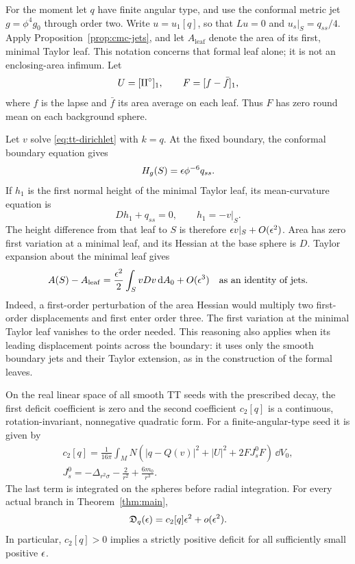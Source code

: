 For the moment let $q$ have finite angular type, and use the conformal
metric jet $g=\phi^4g_0$ through order two.  Write $u=u_1[q]$, so that
$Lu=0$ and $u_s|_S=q_{ss}/4$.  Apply
Proposition~\ref{prop:cmc-jets}, and let $A_{\mathrm{leaf}}$ denote the
area of its first, minimal Taylor leaf.  This notation concerns that
formal leaf alone; it is not an enclosing-area infimum.  Let
\[
 U=[\mathrm{II}^{\circ}]_1,
 \qquad F=[f-\bar f]_1,
\]
where $f$ is the lapse and $\bar f$ its area average on each leaf.
Thus $F$ has zero round mean on each background sphere.

Let $v$ solve \eqref{eq:tt-dirichlet} with $k=q$.  At the fixed boundary,
the conformal boundary equation gives
\[
 H_g(S)=\epsilon\phi^{-6}q_{ss}.
\]
If $h_1$ is the first normal height of the minimal Taylor leaf, its
mean-curvature equation is
\[
 Dh_1+q_{ss}=0,
 \qquad h_1=-v|_S.
\]
The height difference from that leaf to $S$ is therefore
$\epsilon v|_S+O(\epsilon^2)$.  Area has zero first variation at a minimal
leaf, and its Hessian at the base sphere is $D$.  Taylor expansion about
the minimal leaf gives
\begin{equation}
 A(S)-A_{\mathrm{leaf}}
 =\frac{\epsilon^2}{2}\int_SvDv\,\mathrm{d} A_0+O(\epsilon^3)
 \quad\text{as an identity of jets}.
 \label{eq:quadratic-area-gap}
\end{equation}
Indeed, a first-order perturbation of the area Hessian would multiply
two first-order displacements and first enter order three.  The first
variation at the minimal Taylor leaf vanishes to the order needed.
This reasoning also applies when its leading displacement points across
the boundary: it uses only the smooth boundary jets and their Taylor
extension, as in the construction of the formal leaves.

\begin{proposition}
\label{prop:quadratic}
On the real linear space of all smooth TT seeds with the prescribed
decay, the first deficit coefficient is zero and the second coefficient
$c_2[q]$ is a continuous, rotation-invariant, nonnegative quadratic form.
For a finite-angular-type seed it is given by
\begin{equation}
 \begin{gathered}
 c_2[q]=\frac1{16\pi}\int_M N\left(
 |q-Q(v)|^2+|U|^2+2FJ_s^0F\right)\,\dd V_0,\\
 J_s^0=-\Delta_{r^2\sigma}-\frac2{r^2}+\frac{6m_0}{r^3}.
 \end{gathered}
 \label{eq:quadratic-positive-form}
\end{equation}
The last term is integrated on the spheres before radial integration.
For every actual branch in Theorem~\ref{thm:main},
\begin{equation}
 \mathfrak D_q(\epsilon)=c_2[q]\epsilon^2+o(\epsilon^2).
 \label{eq:actual-quadratic-deficit}
\end{equation}
In particular, $c_2[q]>0$ implies a strictly positive deficit for all
sufficiently small positive $\epsilon$.
\end{proposition}


